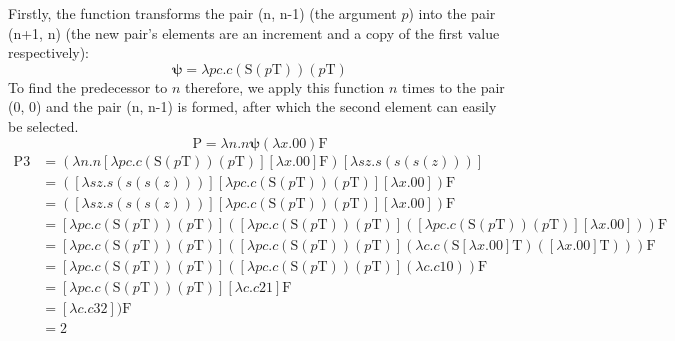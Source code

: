 \documentclass[Master.tex]{subfiles}
\begin{document}
Firstly, the function transforms the pair (n, n-1) (the argument $p$) into the pair (n+1, n) (the new pair's elements are an increment and a copy of the first value respectively):
\begin{equation*}
\bm{\psi} = \lambda pc.c(\bm{\mathrm{S}}(p\bm{\mathrm{T}}))(p\bm{\mathrm{T}})
\end{equation*}
To find the predecessor to $n$ therefore, we apply this function $n$ times to the pair (0, 0) and the pair (n, n-1) is formed, after which the second element can easily be selected.
\begin{equation*}
\bm{\mathrm{P}} = \lambda n.n \bm{\psi} (\lambda x.\bm{\mathrm{00}}) \bm{\mathrm{F}} 
\end{equation*}
\begin{equation*}
\begin{aligned}
\bm{\mathrm{P3}} &= (\lambda n.n [\lambda pc.c(\bm{\mathrm{S}}(p\bm{\mathrm{T}}))(p\bm{\mathrm{T}})] [\lambda x.\bm{\mathrm{00}}] \bm{\mathrm{F}}) [\lambda sz.s(s(s(z)))]\\
&= ([\lambda sz.s(s(s(z)))] [\lambda pc.c(\bm{\mathrm{S}}(p\bm{\mathrm{T}}))(p\bm{\mathrm{T}})] [\lambda x.\bm{\mathrm{00}}]) \bm{\mathrm{F}}\\
&= ([\lambda sz.s(s(s(z)))] [\lambda pc.c(\bm{\mathrm{S}}(p\bm{\mathrm{T}}))(p\bm{\mathrm{T}})] [\lambda x.\bm{\mathrm{00}}]) \bm{\mathrm{F}}\\
&= [\lambda pc.c(\bm{\mathrm{S}}(p\bm{\mathrm{T}}))(p\bm{\mathrm{T}})]([\lambda pc.c(\bm{\mathrm{S}}(p\bm{\mathrm{T}}))(p\bm{\mathrm{T}})]([\lambda pc.c(\bm{\mathrm{S}}(p\bm{\mathrm{T}}))(p\bm{\mathrm{T}})][\lambda x.\bm{\mathrm{00}}]))\bm{\mathrm{F}}\\
&= [\lambda pc.c(\bm{\mathrm{S}}(p\bm{\mathrm{T}}))(p\bm{\mathrm{T}})]([\lambda pc.c(\bm{\mathrm{S}}(p\bm{\mathrm{T}}))(p\bm{\mathrm{T}})](\lambda c.c(\bm{\mathrm{S}}[\lambda x.\bm{\mathrm{00}}]\bm{\mathrm{T}})([\lambda x.\bm{\mathrm{00}}]\bm{\mathrm{T}})))\bm{\mathrm{F}}\\
&= [\lambda pc.c(\bm{\mathrm{S}}(p\bm{\mathrm{T}}))(p\bm{\mathrm{T}})]([\lambda pc.c(\bm{\mathrm{S}}(p\bm{\mathrm{T}}))(p\bm{\mathrm{T}})](\lambda c.c\bm{\mathrm{10}}))\bm{\mathrm{F}}\\
&= [\lambda pc.c(\bm{\mathrm{S}}(p\bm{\mathrm{T}}))(p\bm{\mathrm{T}})][\lambda c.c\bm{\mathrm{21}}]\bm{\mathrm{F}}\\
&= [\lambda c.c\bm{\mathrm{32}} ])\bm{\mathrm{F}}\\
&= \bm{\mathrm{2}}
\end{aligned}
\end{equation*}
\end{document}
